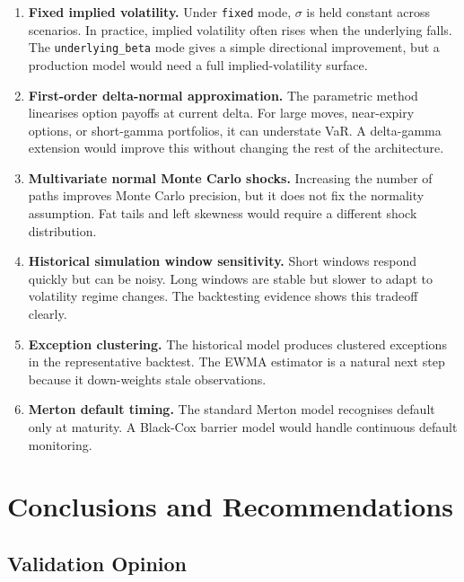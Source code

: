 \documentclass[11pt]{article}
\newcommand{\code}[1]{\texttt{#1}}
\begin{document}
\begin{enumerate}

\item \textbf{Fixed implied volatility.}  Under \code{fixed} mode, $\sigma$
is held constant across scenarios.  In practice, implied volatility often
rises when the underlying falls.  The \code{underlying\_beta} mode gives
a simple directional improvement, but a production model would need a
full implied-volatility surface.

\item \textbf{First-order delta-normal approximation.}  The parametric
method linearises option payoffs at current delta.  For large moves,
near-expiry options, or short-gamma portfolios, it can understate VaR.
A delta-gamma extension would improve this without changing the rest of
the architecture.

\item \textbf{Multivariate normal Monte Carlo shocks.}  Increasing the
number of paths improves Monte Carlo precision, but it does not fix the
normality assumption.  Fat tails and left skewness would require a
different shock distribution.

\item \textbf{Historical simulation window sensitivity.}  Short windows
respond quickly but can be noisy.  Long windows are stable but slower to
adapt to volatility regime changes.  The backtesting evidence shows this
tradeoff clearly.

\item \textbf{Exception clustering.}  The historical model produces
clustered exceptions in the representative backtest.  The EWMA estimator
is a natural next step because it down-weights stale observations.

\item \textbf{Merton default timing.}  The standard Merton model recognises
default only at maturity.  A Black-Cox barrier model would handle
continuous default monitoring.

\end{enumerate}

\section{Conclusions and Recommendations}
\label{sec:conclusions}

\subsection{Validation Opinion}
\end{document}
